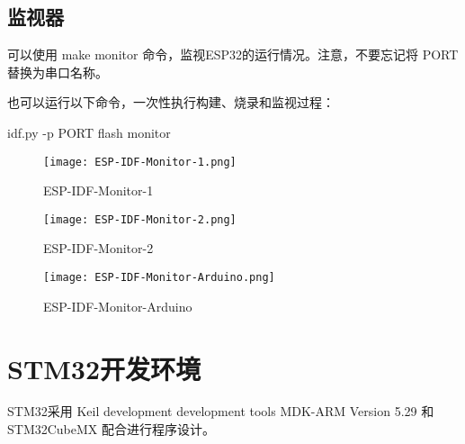 \subsection{监视器}

可以使用 make monitor 命令，监视ESP32的运行情况。注意，不要忘记将 PORT 替换为串口名称。

也可以运行以下命令，一次性执行构建、烧录和监视过程：

\begin{tcolorbox}
    idf.py -p PORT flash monitor
\end{tcolorbox}

\begin{figure}[htbp]
    \centering
    \texttt{[image: ESP-IDF-Monitor-1.png]}
    \caption{ESP-IDF-Monitor-1}
    \label{fig:ESP-IDF-Monitor-1}
\end{figure}

\begin{figure}[htbp]
    \centering
    \texttt{[image: ESP-IDF-Monitor-2.png]}
    \caption{ESP-IDF-Monitor-2}
    \label{fig:ESP-IDF-Monitor-2}
\end{figure}

\begin{figure}[htbp]
    \centering
    \texttt{[image: ESP-IDF-Monitor-Arduino.png]}
    \caption{ESP-IDF-Monitor-Arduino}
    \label{fig:ESP-IDF-Monitor-Arduino}
\end{figure}


\section{STM32开发环境}

STM32采用 Keil development development tools MDK-ARM Version 5.29 和 STM32CubeMX 配合进行程序设计。


